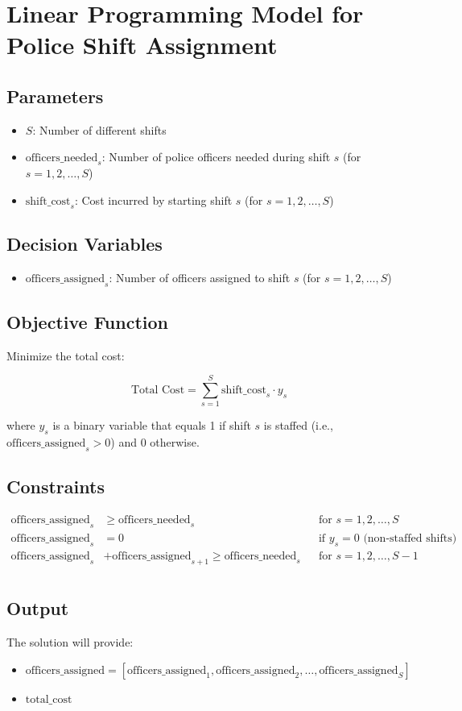 \documentclass{article}
\begin{document}
\section*{Linear Programming Model for Police Shift Assignment}

\subsection*{Parameters}
\begin{itemize}
    \item \( S \): Number of different shifts
    \item \( \text{officers\_needed}_{s} \): Number of police officers needed during shift \( s \) (for \( s = 1, 2, \ldots, S \))
    \item \( \text{shift\_cost}_{s} \): Cost incurred by starting shift \( s \) (for \( s = 1, 2, \ldots, S \))
\end{itemize}

\subsection*{Decision Variables}
\begin{itemize}
    \item \( \text{officers\_assigned}_{s} \): Number of officers assigned to shift \( s \) (for \( s = 1, 2, \ldots, S \))
\end{itemize}

\subsection*{Objective Function}
Minimize the total cost:

\[
\text{Total Cost} = \sum_{s=1}^{S} \text{shift\_cost}_{s} \cdot y_s
\]

where \( y_s \) is a binary variable that equals 1 if shift \( s \) is staffed (i.e., \( \text{officers\_assigned}_{s} > 0 \)) and 0 otherwise.

\subsection*{Constraints}
\begin{align*}
\text{officers\_assigned}_{s} & \geq \text{officers\_needed}_{s} && \text{for } s = 1, 2, \ldots, S \\
\text{officers\_assigned}_{s} & = 0 && \text{if } y_s = 0 \text{ (non-staffed shifts)} \\
\text{officers\_assigned}_{s} & + \text{officers\_assigned}_{s+1} \geq \text{officers\_needed}_{s} && \text{for } s = 1, 2, \ldots, S-1 \\
\end{align*}

\subsection*{Output}
The solution will provide:
\begin{itemize}
    \item \( \text{officers\_assigned} = [\text{officers\_assigned}_{1}, \text{officers\_assigned}_{2}, \ldots, \text{officers\_assigned}_{S}] \)
    \item \( \text{total\_cost} \)
\end{itemize}
\end{document}
